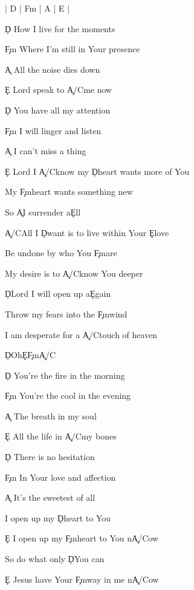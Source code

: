 \documentclass[9pt]{extarticle}
\begin{document}
\bsong

\bi
| D | F\s m | A | E |
\ei

\bv
\c{D} How I live for the moments

\c{F\s m} Where I'm still in Your presence

\c{A} All the noise dies down

\c{E} Lord speak to \c{A/C\s }me now
\ev

\bv
\c{D} You have all my attention

\c{F\s m} I will linger and listen

\c{A} I can't miss a thing
\ev

\bp
\c{E} Lord I \c{A/C\s }know my \c{D}heart wants more of You

My \c{F\s m}heart wants something new

So \c{A}I surrender a\c{E}ll
\ep

\bc
\c{A/C\s }All I \c{D}want is to live within Your \c{E}love

Be undone by who You \c{F\s m}are

My desire is to \c{A/C\s }know You deeper

\c{D}Lord I will open up a\c{E}gain

Throw my fears into the \c{F\s m}wind

I am desperate for a \c{A/C\s }touch of heaven

\c{D}Oh\c{E}\c{F\s m}\c{A/C\s }
\ec

\bv
\c{D} You're the fire in the morning

\c{F\s m} You're the cool in the evening

\c{A} The breath in my soul

\c{E} All the life in \c{A/C\s }my bones
\ev

\bv
\c{D} There is no hesitation

\c{F\s m} In Your love and affection

\c{A} It's the sweetest of all
\ev



\bb[2]
I open up my \c{D}heart to You

\c{E} I open up my \c{F\s m}heart to You n\c{A/C\s }ow

So do what only \c{D}You can

\c{E} Jesus have Your \c{F\s m}way in me n\c{A/C\s }ow
\eb


\esong
\end{document}
